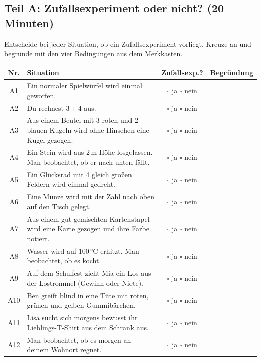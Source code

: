 \subsection*{Teil A: Zufallsexperiment oder nicht? (20 Minuten)}

Entscheide bei jeder Situation, ob ein Zufallsexperiment vorliegt. Kreuze an und begründe mit den vier Bedingungen aus dem Merkkasten.

\renewcommand{\arraystretch}{1.6}
\begin{center}
\begin{tabularx}{\textwidth}{|c|X|c|p{4.4cm}|}
\hline
\textbf{Nr.} & \textbf{Situation} & \textbf{Zufallsexp.?} & \textbf{Begründung} \\
\hline
A1 & Ein normaler Spielwürfel wird einmal geworfen. & $\square$ ja \; $\square$ nein & \\
\hline
A2 & Du rechnest $3 + 4$ aus. & $\square$ ja \; $\square$ nein & \\
\hline
A3 & Aus einem Beutel mit 3 roten und 2 blauen Kugeln wird ohne Hinsehen eine Kugel gezogen. & $\square$ ja \; $\square$ nein & \\
\hline
A4 & Ein Stein wird aus 2\,m Höhe losgelassen. Man beobachtet, ob er nach unten fällt. & $\square$ ja \; $\square$ nein & \\
\hline
A5 & Ein Glücksrad mit 4 gleich großen Feldern wird einmal gedreht. & $\square$ ja \; $\square$ nein & \\
\hline
A6 & Eine Münze wird mit der Zahl nach oben auf den Tisch gelegt. & $\square$ ja \; $\square$ nein & \\
\hline
A7 & Aus einem gut gemischten Kartenstapel wird eine Karte gezogen und ihre Farbe notiert. & $\square$ ja \; $\square$ nein & \\
\hline
A8 & Wasser wird auf 100\,°C erhitzt. Man beobachtet, ob es kocht. & $\square$ ja \; $\square$ nein & \\
\hline
A9 & Auf dem Schulfest zieht Mia ein Los aus der Lostrommel (Gewinn oder Niete). & $\square$ ja \; $\square$ nein & \\
\hline
A10 & Ben greift blind in eine Tüte mit roten, grünen und gelben Gummibärchen. & $\square$ ja \; $\square$ nein & \\
\hline
A11 & Lisa sucht sich morgens bewusst ihr Lieblings-T-Shirt aus dem Schrank aus. & $\square$ ja \; $\square$ nein & \\
\hline
A12 & Man beobachtet, ob es morgen an deinem Wohnort regnet. & $\square$ ja \; $\square$ nein & \\
\hline
\end{tabularx}
\end{center}
\renewcommand{\arraystretch}{1}
